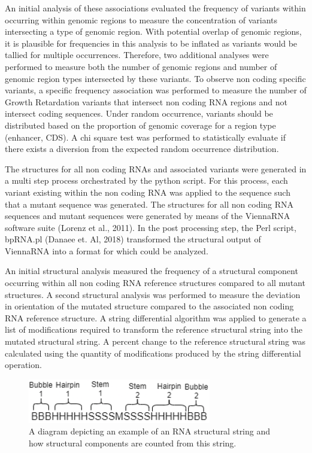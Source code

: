 \documentclass[11pt]{article}
\begin{document}
An initial analysis of these associations evaluated the frequency of variants within occurring within genomic regions to measure the concentration of variants intersecting a type of genomic region. With potential overlap of genomic regions, it is plausible for frequencies in this analysis to be inflated as variants would be tallied for multiple occurrences. Therefore, two additional analyses were performed to measure both the number of genomic regions and number of genomic region types intersected by these variants. To observe non coding specific variants, a specific frequency association was performed to measure the number of Growth Retardation variants that intersect non coding RNA regions and not intersect coding sequences. Under random occurrence, variants should be distributed based on the proportion of genomic coverage for a region type (enhancer, CDS). A chi square test was performed to statistically evaluate if there exists a diversion from the expected random occurrence distribution.  

The structures for all non coding RNAs and associated variants were generated in a multi step process orchestrated by the python script. For this process, each variant existing within the non coding RNA was applied to the sequence such that a mutant sequence was generated. The structures for all non coding RNA sequences and mutant sequences were generated by means of the ViennaRNA software suite (Lorenz et al., 2011). In the post processing step, the Perl script, bpRNA.pl (Danaee et. Al, 2018) transformed the structural output of ViennaRNA into a format for which could be analyzed.  

An initial structural analysis measured the frequency of a structural component occurring within all non coding RNA reference structures compared to all mutant structures. A second structural analysis was performed to measure the deviation in orientation of the mutated structure compared to the associated non coding RNA reference structure. A string differential algorithm was applied to generate a list of modifications required to transform the reference structural string into the mutated structural string. A percent change to the reference structural string was calculated using the quantity of modifications produced by the string differential operation.  

\begin{figure}[t]
	\centering
	\includegraphics[width=8cm]{struct-freq}
	\caption{A diagram depicting an example of an RNA structural string and how structural components are counted from this string.
	}
	\label{fig:mesh1}
\end{figure}
\end{document}
